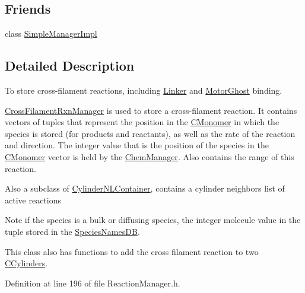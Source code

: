 \subsection*{Friends}
\begin{DoxyCompactItemize}
\item 
class \hyperlink{classCrossFilamentRxnManager_a65026d22c7682cf798dda845cac7573a}{Simple\+Manager\+Impl}
\end{DoxyCompactItemize}


\subsection{Detailed Description}
To store cross-\/filament reactions, including \hyperlink{classLinker}{Linker} and \hyperlink{classMotorGhost}{Motor\+Ghost} binding. 

\hyperlink{classCrossFilamentRxnManager}{Cross\+Filament\+Rxn\+Manager} is used to store a cross-\/filament reaction. It contains vectors of tuples that represent the position in the \hyperlink{classCMonomer}{C\+Monomer} in which the species is stored (for products and reactants), as well as the rate of the reaction and direction. The integer value that is the position of the species in the \hyperlink{classCMonomer}{C\+Monomer} vector is held by the \hyperlink{classChemManager}{Chem\+Manager}. Also contains the range of this reaction.

Also a subclass of \hyperlink{classCylinderNLContainer}{Cylinder\+N\+L\+Container}, contains a cylinder neighbors list of active reactions

\begin{DoxyNote}{Note}
if the species is a bulk or diffusing species, the integer molecule value in the tuple stored in the \hyperlink{classSpeciesNamesDB}{Species\+Names\+D\+B}.
\end{DoxyNote}
This class also has functions to add the cross filament reaction to two \hyperlink{classCCylinder}{C\+Cylinders}. 

Definition at line 196 of file Reaction\+Manager.\+h.




